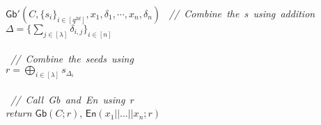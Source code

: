 \documentclass{article}
\newcommand{\comment}[1]{\sl\small\color{black!50} \mbox{ // #1 }}
\begin{document}
\begin{codebox}{$\mathsf{Gb}'(C, \{s_i\}_{i \in [q^{2d}]}, x_1, \delta_1, \cdots, x_n, \delta_n)$}
    \comment{Combine the \delta{}s using addition}\\
    $\Delta = \{ \sum_{j \in [\lambda]}  \delta_{i,j} \}_{i \in [n]}$\\
    \\
    \comment{Combine the seeds using \Delta}\\
    $r = \bigoplus_{i \in [\lambda]} s_{\Delta_i}$\\
    \\
    \comment{Call \textsf{Gb} and \textsf{En} using $r$}\\
    return $\textsf{Gb}(C; r),\, \textsf{En}(x_1 || \dots || x_n; r)$
\end{codebox}
\end{document}
